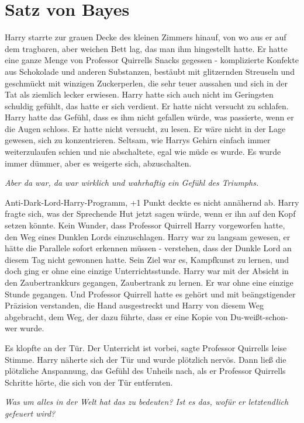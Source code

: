 \chapter{Satz von Bayes}

Harry starrte zur grauen Decke des kleinen Zimmers hinauf, von wo
aus er auf dem tragbaren, aber weichen Bett lag, das man ihm hingestellt hatte.
Er hatte eine ganze Menge von Professor Quirrells Snacks gegessen - komplizierte
Konfekte aus Schokolade und anderen Substanzen, bestäubt mit glitzernden
Streuseln und geschmückt mit winzigen Zuckerperlen, die sehr teuer aussahen und
sich in der Tat als ziemlich lecker erwiesen. Harry hatte sich auch nicht im
Geringsten schuldig gefühlt, das hatte er sich verdient. Er hatte nicht versucht
zu schlafen. Harry hatte das Gefühl, dass es ihm nicht gefallen würde, was
passierte, wenn er die Augen schloss. Er hatte nicht versucht, zu lesen. Er wäre
nicht in der Lage gewesen, sich zu konzentrieren. Seltsam, wie Harrys Gehirn
einfach immer weiterzulaufen schien und nie abschaltete, egal wie müde es wurde.
Es wurde immer dümmer, aber es weigerte sich, abzuschalten.

\emph{Aber da war, da war wirklich und wahrhaftig ein Gefühl des Triumphs.}

Anti-Dark-Lord-Harry-Programm, +1 Punkt deckte es nicht annähernd ab. Harry
fragte sich, was der Sprechende Hut jetzt sagen würde, wenn er ihn auf den Kopf
setzen könnte. Kein Wunder, dass Professor Quirrell Harry vorgeworfen hatte, den
Weg eines Dunklen Lords einzuschlagen. Harry war zu langsam gewesen, er hätte
die Parallele sofort erkennen müssen - verstehen, dass der Dunkle Lord an diesem
Tag nicht gewonnen hatte. Sein Ziel war es, Kampfkunst zu lernen, und doch ging
er ohne eine einzige Unterrichtsstunde. Harry war mit der Absicht in den
Zaubertrankkurs gegangen, Zaubertrank zu lernen. Er war ohne eine einzige Stunde
gegangen. Und Professor Quirrell hatte es gehört und mit beängstigender
Präzision verstanden, die Hand ausgestreckt und Harry von diesem Weg abgebracht,
dem Weg, der dazu führte, dass er eine Kopie von Du-weißt-schon-wer wurde.

Es klopfte an der Tür. \glqq{}Der Unterricht ist vorbei\grqq{}, sagte Professor
Quirrells leise Stimme. Harry näherte sich der Tür und wurde plötzlich nervös.
Dann ließ die plötzliche Anspannung, das Gefühl des Unheils nach, als er
Professor Quirrells Schritte hörte, die sich von der Tür entfernten.

\emph{Was um alles in der Welt hat das zu bedeuten? Ist es das, wofür er
letztendlich gefeuert wird?}

